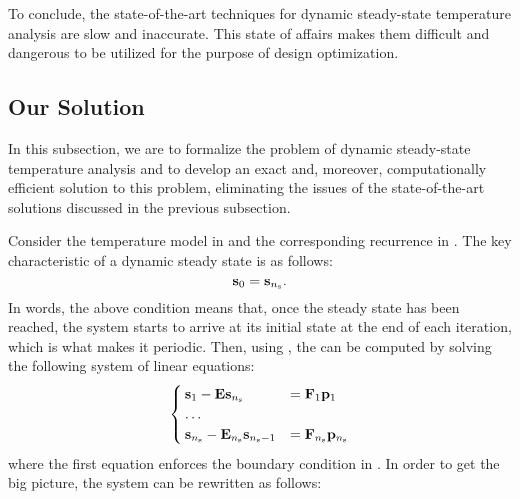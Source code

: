 To conclude, the state-of-the-art techniques for dynamic steady-state
temperature analysis are slow and inaccurate. This state of affairs makes them
difficult and dangerous to be utilized for the purpose of design optimization.

\subsection{Our Solution}

In this subsection, we are to formalize the problem of dynamic steady-state
temperature analysis and to develop an exact and, moreover, computationally
efficient solution to this problem, eliminating the issues of the
state-of-the-art solutions discussed in the previous subsection.

Consider the temperature model in  and the corresponding
recurrence in . The key characteristic of a dynamic steady
state is as follows:
\begin{equation} \elab{boundary-condition}
  \vs_0 = \vs_\ns.
\end{equation}
In words, the above condition means that, once the steady state has been
reached, the system starts to arrive at its initial state at the end of each
iteration, which is what makes it periodic. Then, using , the
 can be computed by solving the following system of linear equations:
\[
  \begin{cases}
    \mathbf{s}_1 - \mathbf{E} \mathbf{s}_{n_\mathrm{s}} & = \mathbf{F}_1 \mathbf{p}_1 \\
    \dots \\
    \mathbf{s}_{n_\mathrm{s}} - \mathbf{E}_{n_\mathrm{s}} \mathbf{s}_{{n_\mathrm{s}} - 1} & = \mathbf{F}_{n_\mathrm{s}} \mathbf{p}_{n_\mathrm{s}}
  \end{cases}
\]
where the first equation enforces the boundary condition in
. In order to get the big picture, the system can be
rewritten as follows:
